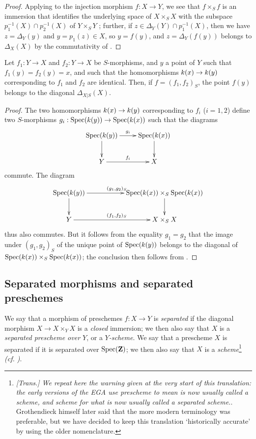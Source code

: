 \begin{proof}
\label{proof-1.5.3.16}
Applying  to the injection morphism $f:X\to Y$, we see that $f\times_S f$ is an immersion that identifies the underlying space of $X\times_S X$ with the subspace $p_1^{-1}(X)\cap p_2^{-1}(X)$ of $Y\times_S Y$ ;
further, if $z\in\Delta_Y(Y)\cap p_1^{-1}(X)$, then we have $z=\Delta_Y(y)$
and $y=p_1(z)\in X$, so $y=f(y)$, and $z=\Delta_Y(f(y))$ belongs to $\Delta_X(X)$ by the commutativity of .
\end{proof}

\begin{corollary}[5.3.17]
\label{1.5.3.17}
Let $f_1:Y\to X$ and $f_2:Y\to X$ be $S$-morphisms, and $y$ a point of $Y$ such that $f_1(y)=f_2(y)=x$, and such that the homomorphisms $\kres(x)\to\kres(y)$ corresponding to $f_1 $ and $f_2$ are identical.
Then, if $f=(f_1,f_2)_S$, the point $f(y)$ belongs to the diagonal $\Delta_{X|S}(X)$.
\end{corollary}

\begin{proof}
\label{proof-1.5.3.17}
The two homomorphisms $\kres(x)\to\kres(y)$ corresponding to $f_i$ ($i=1,2$) define two $S$-morphisms $g_i:\Spec(\kres(y))\to\Spec(\kres(x))$ such that the diagrams
\[
  \xymatrix{
    \Spec(\kres(y))\ar[r]^{g_i}\ar[d] &
    \Spec(\kres(x))\ar[d]\\
    Y\ar[r]^{f_i} &
    X
  }
\]
commute.
The diagram
\[
  \xymatrix{
    \Spec(\kres(y))\ar[rr]^{(g_1,g_2)_S}\ar[d] & &
    \Spec(\kres(x))\times_S\Spec(\kres(x))\ar[d]\\
    Y\ar[rr]^{(f_1,f_2)_S} & &
    X\times_S X
  }
\]
thus also commutes.
But it follows from the equality $g_1=g_2$ that the image under $(g_1,g_2)_S$ of the unique point of $\operatorname{Spec}(k(y))$ belongs to the diagonal of $\operatorname{Spec}(k(x))\times_S\operatorname{Spec}(k(x))$;
the conclusion then follows from .
\end{proof}

\subsection{Separated morphisms and separated preschemes}
\label{subsection:1.5.4}

\begin{definition}[5.4.1]
\label{1.5.4.1}
We say that a morphism of preschemes $f:X\to Y$ is \emph{separated} if the diagonal morphism $X\to X\times_Y X$ is a \emph{closed} immersion; we then also say that $X$ is a \emph{separated prescheme over $Y$}, or a \emph{$Y$-scheme}.
We say that a prescheme $X$ is separated if it is separated over $\operatorname{Spec}(\mathbf{Z})$;
we then also say that $X$ is a \emph{scheme}\footnote{\emph{[Trans.] We repeat here the warning given at the very start of this translation: the early versions of the EGA use \emph{prescheme} to mean is now usually called a scheme, and \emph{scheme} for what is now usually called a separated scheme.}. Grothendieck himself later said that the more modern terminology was preferable, but we have decided to keep this translation `historically accurate' by using the older nomenclature.} \emph{(cf. )}.
\end{definition}

